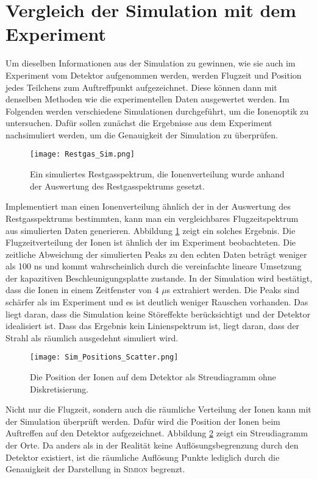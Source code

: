 \section{Vergleich der Simulation mit dem Experiment}
Um dieselben Informationen aus der Simulation zu gewinnen, wie sie auch im Experiment vom Detektor aufgenommen werden, werden Flugzeit und Position jedes Teilchens zum Auftreffpunkt aufgezeichnet. Diese können dann mit denselben Methoden wie die experimentellen Daten ausgewertet werden. Im Folgenden werden verschiedene Simulationen durchgeführt, um die Ionenoptik zu untersuchen. Dafür sollen zunächst die Ergebnisse aus dem Experiment nachsimuliert werden, um die Genauigkeit der Simulation zu überprüfen. 


\begin{figure}
    \centering
    \texttt{[image: Restgas\_Sim.png]}
    \caption[Simuliertes Restgasspektrum]{Ein simuliertes Restgasspektrum, die Ionenverteilung wurde anhand der Auswertung des Restgasspektrums gesetzt.}
    \label{fig:Restgas_Sim}
\end{figure}

Implementiert man einen Ionenverteilung ähnlich der in der Auswertung des Restgasspektrums bestimmten, kann man ein vergleichbares Flugzeitspektrum aus simulierten Daten generieren. Abbildung \ref{fig:Restgas_Sim} zeigt ein solches Ergebnis. Die Flugzeitverteilung der Ionen ist ähnlich der im Experiment beobachteten. Die zeitliche Abweichung der simulierten Peaks zu den echten Daten beträgt weniger als 100 ns und kommt wahrscheinlich durch die vereinfachte lineare Umsetzung der kapazitiven Beschleunigungsplatte zustande. In der Simulation wird bestätigt, dass die Ionen in einem Zeitfenster von 4 $\mu$s extrahiert werden. Die Peaks sind schärfer als im Experiment und es ist deutlich weniger Rauschen vorhanden. Das liegt daran, dass die Simulation keine Störeffekte berücksichtigt und der Detektor idealisiert ist. Dass das Ergebnis kein Linienspektrum ist, liegt daran, dass der Strahl als räumlich ausgedehnt simuliert wird.

\begin{figure}[H]
    \centering
    \texttt{[image: Sim\_Positions\_Scatter.png]}
    \caption[Streudiagramm der simulierten Ionenposition auf dem Detektor ]{Die Position der Ionen auf dem Detektor als Streudiagramm ohne Diskretisierung.}
    \label{fig:sim_pos_scatter}
\end{figure}

Nicht nur die Flugzeit, sondern auch die räumliche Verteilung der Ionen kann mit der Simulation überprüft werden. Dafür wird die Position der Ionen beim Auftreffen auf den Detektor aufgezeichnet. Abbildung \ref{fig:sim_pos_scatter} zeigt ein Streudiagramm der Orte. Da anders als in der Realität keine Auflösungsbegrenzung durch den Detektor existiert, ist die räumliche Auflösung Punkte lediglich durch die Genauigkeit der Darstellung in \textsc{Simion} begrenzt.

